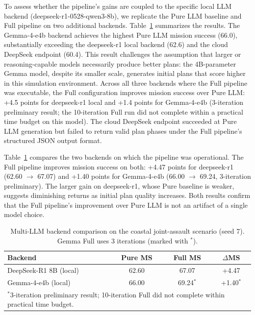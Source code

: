 To assess whether the pipeline's gains are coupled to the specific local LLM backend (deepseek-r1-0528-qwen3-8b), we replicate the Pure LLM baseline and Full pipeline on two additional backends. Table~\ref{tab:multillm} summarizes the results. The Gemma-4-e4b backend achieves the highest Pure LLM mission success (66.0), substantially exceeding the deepseek-r1 local backend (62.6) and the cloud DeepSeek endpoint (60.4). This result challenges the assumption that larger or reasoning-capable models necessarily produce better plans: the 4B-parameter Gemma model, despite its smaller scale, generates initial plans that score higher in this simulation environment. Across all three backends where the Full pipeline was executable, the Full configuration improves mission success over Pure LLM: +4.5 points for deepseek-r1 local and +1.4 points for Gemma-4-e4b (3-iteration preliminary result; the 10-iteration Full run did not complete within a practical time budget on this model). The cloud DeepSeek endpoint succeeded at Pure LLM generation but failed to return valid plan phases under the Full pipeline's structured JSON output format.

Table~\ref{tab:multillm} compares the two backends on which the pipeline was operational. The Full pipeline improves mission success on both: +4.47 points for deepseek-r1 (62.60 $\rightarrow$ 67.07) and +1.40 points for Gemma-4-e4b (66.00 $\rightarrow$ 69.24, 3-iteration preliminary). The larger gain on deepseek-r1, whose Pure baseline is weaker, suggests diminishing returns as initial plan quality increases. Both results confirm that the Full pipeline's improvement over Pure LLM is not an artifact of a single model choice.

\begin{table}[ht]
\centering
\caption{Multi-LLM backend comparison on the coastal joint-assault scenario (seed 7). Gemma Full uses 3 iterations (marked with $^*$).}
\label{tab:multillm}
\small
\setlength{\tabcolsep}{5pt}
\begin{tabular}{lccc}
\toprule
Backend & Pure MS & Full MS & $\Delta$MS \\
\midrule
DeepSeek-R1 8B (local) & 62.60 & 67.07 & +4.47 \\
Gemma-4-e4b (local) & 66.00 & 69.24$^*$ & +1.40$^*$ \\
\bottomrule
\multicolumn{4}{p{0.9\textwidth}}{\footnotesize $^*$3-iteration preliminary result; 10-iteration Full did not complete within practical time budget.}\\
\end{tabular}
\end{table}


